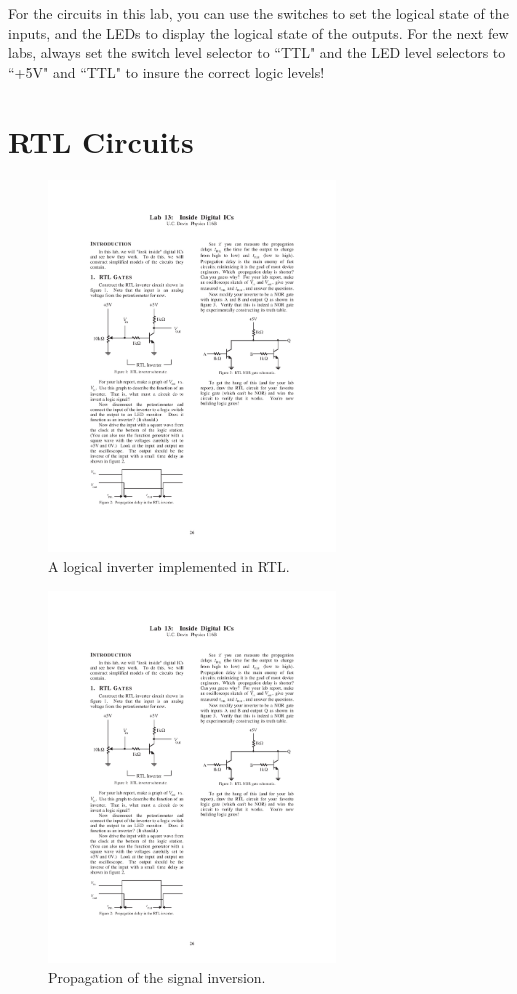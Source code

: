 \documentclass[12pt]{article}
\begin{document}
For the circuits in this lab, you can use the switches to set the logical state of the inputs, and the LEDs to display the logical state
of the outputs. For the next few labs, always set the switch level selector to ``TTL" and the LED level selectors to ``+5V" and ``TTL" to insure the correct logic levels! 

\section*{RTL Circuits}

\begin{figure}[!h]
\centerline{\includegraphics[width=3in]{figs/inverter.pdf}}
\caption{A logical inverter implemented in RTL.}
\label{fig:inverter}
\end{figure}

\begin{figure}[!h]
\centerline{\includegraphics[width=3in]{figs/propagation.pdf}}
\caption{Propagation of the signal inversion.}
\label{fig:propagation}
\end{figure}
\end{document}
